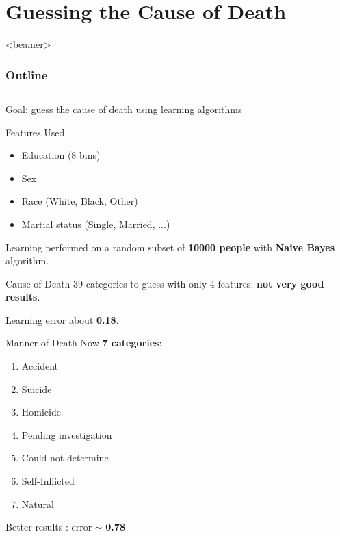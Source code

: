 \documentclass[xcolor=table]{beamer}
\begin{document}
\section{Guessing the Cause of Death}
{
     \begin{frame}<beamer>
     \frametitle{Outline}
     \tableofcontents[currentsection]
     \end{frame}
}
\subsection{}
\begin{frame}
  Goal: guess the cause of death using learning algorithms
\end{frame}

\begin{frame}{Features Used}
\begin{itemize}
  \item Education (8 bins)
  \item Sex
  \item Race (White, Black, Other)
  \item Martial status (Single, Married, ...)
\end{itemize}

\bigskip

Learning performed on a random subset of \textbf{10000 people} with \textbf{Naive Bayes} algorithm.
\end{frame}



\begin{frame}{Cause of Death}
  39 categories to guess with only 4 features: \textbf{not very good results}.
  
  \bigskip
  
  Learning error about \textbf{0.18}.
\end{frame}

\begin{frame}{Manner of Death}
  Now \textbf{7 categories}:
  \begin{enumerate}
    \item Accident
    \item Suicide
    \item Homicide
    \item Pending investigation
    \item Could not determine
    \item Self-Inflicted
    \item Natural
  \end{enumerate}
  
  \bigskip
  
  Better results : error $\sim$ \textbf{0.78}
\end{frame}
\end{document}
